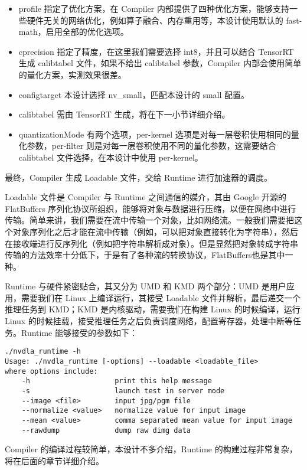 \begin{itemize}
    \item profile 指定了优化方案，在 Compiler 内部提供了四种优化方案，能够支持一些硬件无关的网络优化，例如算子融合、内存重用等，本设计使用默认的 fast-math，启用全部的优化选项。
    \item cprecision 指定了精度，在这里我们需要选择 int8，并且可以结合 TensorRT 生成 calibtabel 文件，如果不给出 calibtabel 参数，Compiler 内部会使用简单的量化方案，实测效果很差。
    \item configtarget 本设计选择 nv\_small，匹配本设计的 small 配置。
    \item calibtabel 需由 TensorRT 生成，将在下一小节详细介绍。
    \item quantizationMode 有两个选项，per-kernel 选项是对每一层卷积使用相同的量化参数，per-filter 则是对每一层卷积使用不同的量化参数，这需要结合 calibtabel 文件选择，在本设计中使用 per-kernel。
\end{itemize}

最终，Compiler 生成 Loadable 文件，交给 Runtime 进行加速器的调度。

Loadable 文件是 Compiler 与 Runtime 之间通信的媒介，其由 Google 开源的 FlatBuffers 序列化协议所组织，能够将对象与数据进行压缩，以便在网络中进行传输。简单来讲，我们需要在流中传输一个对象，比如网络流。一般我们需要把这个对象序列化之后才能在流中传输（例如，可以把对象直接转化为字符串），然后在接收端进行反序列化（例如把字符串解析成对象）。但是显然把对象转成字符串传输的方法效率十分低下，于是有了各种流的转换协议，FlatBuffers也是其中一种。

Runtime 与硬件紧密贴合，其又分为 UMD 和 KMD 两个部分：UMD 是用户应用，需要我们在 Linux 上编译运行，其接受 Loadable 文件并解析，最后递交一个推理任务到 KMD；KMD 是内核驱动，需要我们在构建 Linux 的时候编译，运行 Linux 的时候挂载，接受推理任务之后负责调度网络，配置寄存器，处理中断等任务。Runtime 能够接受的参数如下：

\begin{lstlisting}
./nvdla_runtime -h
Usage: ./nvdla_runtime [-options] --loadable <loadable_file>
where options include:
    -h                    print this help message
    -s                    launch test in server mode
    --image <file>        input jpg/pgm file
    --normalize <value>   normalize value for input image
    --mean <value>        comma separated mean value for input image
    --rawdump             dump raw dimg data
\end{lstlisting}

Compiler 的编译过程较简单，本设计不多介绍，Runtime 的构建过程非常复杂，将在后面的章节详细介绍。

